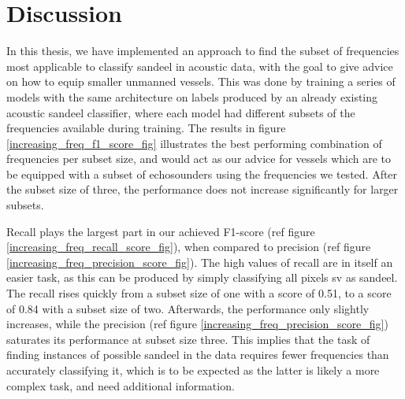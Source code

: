 \chapter{Discussion}
    In this thesis, we have implemented an approach to find the subset of frequencies most applicable to classify sandeel in acoustic data, with the goal to give advice on how to equip smaller unmanned vessels. This was done by training a series of models with the same architecture on labels produced by an already existing acoustic sandeel classifier, where each model had different subsets of the frequencies available during training. The results in figure  \ref{increasing_freq_f1_score_fig} illustrates the best performing combination of frequencies per subset size, and would act as our advice for vessels which are to be equipped with a subset of echosounders using the frequencies we tested. After the subset size of three, the performance does not increase significantly for larger subsets. 
    
    
    Recall plays the largest part in our achieved F1-score (ref figure \ref{increasing_freq_recall_score_fig}), when compared to precision (ref figure \ref{increasing_freq_precision_score_fig}). The high values of recall are in itself an easier task, as this can be produced by simply classifying all pixels \gls{sv} as sandeel. The recall rises quickly from a subset size of one with a score of 0.51, to a score of 0.84 with a subset size of two. Afterwards, the performance  only slightly increases, while the precision (ref figure \ref{increasing_freq_precision_score_fig}) saturates its performance at subset size three. This implies that the task of finding instances of possible sandeel in the data requires fewer frequencies than accurately classifying it, which is to be expected as the latter is likely a more complex task, and need additional information. 
    
